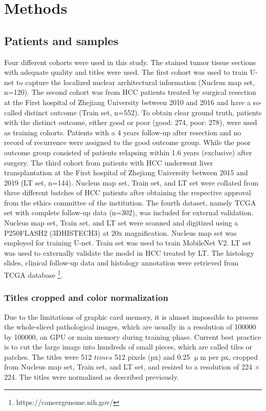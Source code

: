 \documentclass{article}
\begin{document}
\section{Methods}
\subsection{Patients and samples}

Four different cohorts were used in this study. The stained tumor tissue sections with adequate quality and titles were used. The first cohort was used to train U-net to capture the localized nuclear architectural information (Nucleus map set, n=120). The second cohort was from HCC patients treated by surgical resection at the First hospital of Zhejiang University between 2010 and 2016 and have a so-called distinct outcome (Train set, n=552). To obtain clear ground truth, patients with the distinct outcome, either good or poor (good: 274, poor: 278), were used as training cohorts. Patients with a 4 years follow-up after resection and no record of recurrence were assigned to the good outcome group. While the poor outcome group consisted of patients relapsing within 1.6 years (exclusive) after surgery. The third cohort from patients with HCC underwent liver transplantation at the First hospital of Zhejiang University between 2015 and 2019 (LT set, n=144). Nucleus map set, Train set, and LT set were collated from three different batches of HCC patients after obtaining the respective approval from the ethics committee of the institution. The fourth dataset, namely TCGA set with complete follow-up data (n=302), was included for external validation.
Nucleus map set, Train set, and LT set were scanned and digitized using a P250FLASH2 (3DHISTECH3) at 20x magnification. Nucleus map set was employed for training U-net. Train set was used to train MobileNet V2. LT set was used to externally validate the model in HCC treated by LT. The histology slides, clinical follow-up data and histology annotation were retrieved from TCGA database \footnote{https://cancergenome.nih.gov/}.



\subsubsection{Titles cropped and color normalization}
Due to the limitations of graphic card memory, it is almost impossible to process the whole-sliced pathological images, which are usually in a resolution of 100000 by 100000, on GPU or main memory during training phase. Current best practice is to cut the large image into hundreds of small pieces, which are called tiles or patches\cite{skrede2020deep}\cite{corredor2019spatial}\cite{kather2019deep}. The titles were 512 $times$ 512 pixels (px) and 0.25 $\upmu$m per px, cropped from Nucleus map set, Train set, and LT set, and resized to a resolution of 224 × 224. The titles were normalized as described previously\cite{tam2016method}.
\end{document}
